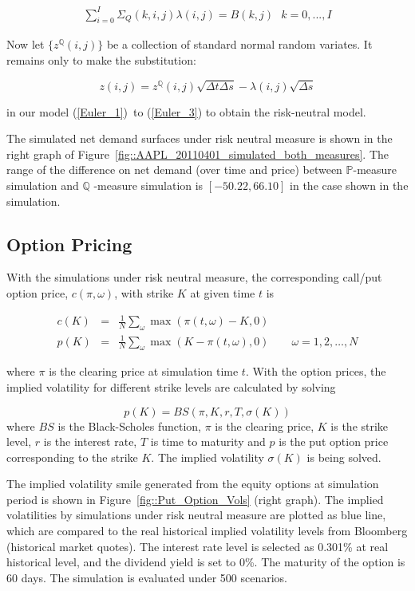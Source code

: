 \documentclass{article}
\begin{document}
\begin{eqnarray} \label{eqn::market_price_risk_equation}
\sum_{i=0}^{I}\Sigma _{Q}(k,i,j)\lambda (i,j)=B(k,j)\text{ \ \ \ }k=0,...,I
\end{eqnarray}

Now let $\{z^{\mathbb{Q}}(i,j)\}$ be a collection of standard normal random
variates. It remains only to make the substitution:

\[
z(i,j)=z^{\mathbb{Q}}(i,j)\sqrt{\Delta t\Delta s}-\lambda (i,j)\sqrt{\Delta s%
}
\]

in our model (\ref{Euler_1})\ to (\ref{Euler_3}) to obtain the risk-neutral
model.

The simulated net demand surfaces under risk neutral measure is shown in the
right graph of Figure~\ref{fig::AAPL_20110401_simulated_both_measures}. The
range of the difference on net demand (over time and price) 
between $\mathbb{P}$-measure simulation and $\mathbb{Q}$%
-measure simulation is $[-50.22,66.10]$ in the case shown in the simulation.

\subsection{Option Pricing}

With the simulations under risk neutral measure, the corresponding call/put
option price, $c(\pi, \omega)$, with strike $K$ at given time $t$ is

\begin{eqnarray*}
c(K) &=& \frac{1}{N} \sum_{\omega} \max\left(\pi(t,\omega)-K,0\right) \\
p(K) &=& \frac{1}{N} \sum_{\omega} \max\left(K - \pi(t,\omega),0\right)
\qquad \omega = 1,2,\ldots,N
\end{eqnarray*}

where $\pi$ is the clearing price at simulation time $t$. With the option
prices, the implied volatility for different strike levels are calculated by
solving

\begin{equation*}
p(K)=BS(\pi ,K,r,T,\sigma (K))
\end{equation*}%
where $BS$ is the Black-Scholes function, $\pi $ is the clearing price, $K$
is the strike level, $r$ is the interest rate, $T$ is time to maturity and $%
p $ is the put option price corresponding to the strike $K$. The implied
volatility $\sigma (K)$ is being solved.

The implied volatility smile generated from the equity options at simulation
period is shown in Figure~\ref{fig::Put_Option_Vols} (right graph). The
implied volatilities by simulations under risk neutral measure are plotted
as blue line, which are compared to the real historical implied volatility
levels from Bloomberg (historical market quotes). The interest rate level 
is selected as 0.301\% at real historical level, and the dividend yield 
is set to 0\%. The maturity of the option is 60 days. The simulation is 
evaluated under 500 scenarios.
\end{document}
